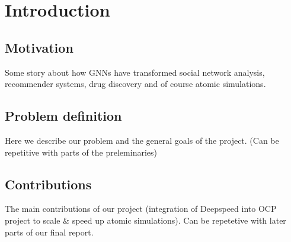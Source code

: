 \section{Introduction}

\subsection{Motivation}

Some story about how GNNs have transformed social network analysis, recommender systems, drug discovery and of course atomic simulations.

\subsection{Problem definition}

Here we describe our problem and the general goals of the project. (Can be repetitive with parts of the preleminaries)

\subsection{Contributions}

The main contributions of our project (integration of Deepspeed into OCP project to scale & speed up atomic simulations). 
Can be repetetive with later parts of our final report.